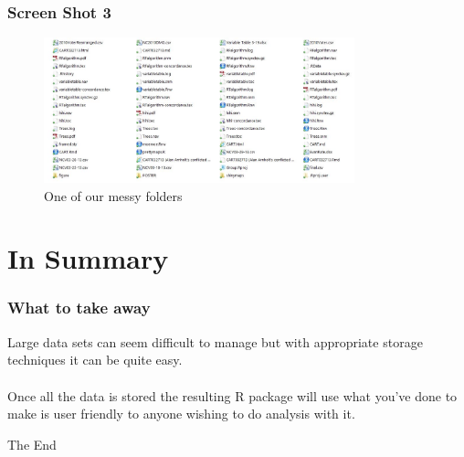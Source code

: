 \documentclass{beamer}\usepackage[]{graphicx}\usepackage[]{color}
\begin{document}

\begin{frame}
\frametitle{Screen Shot 3}
\begin{figure}[ht!]
\centering
\includegraphics[width=90mm]{groupfolder.jpg}
\caption{One of our messy folders}
\label{Group Folder}
\end{figure}
\end{frame}

\section{In Summary}

\begin{frame}
\frametitle{What to take away}
Large data sets can seem difficult to manage but with appropriate storage techniques it can be quite easy. 
\\~\\

Once all the data is stored the resulting R package will use what you've done to make is user friendly to anyone wishing to do analysis with it.

\end{frame}



\begin{frame}
\Huge{\centerline{The End}}
\end{frame}

\end{document}
